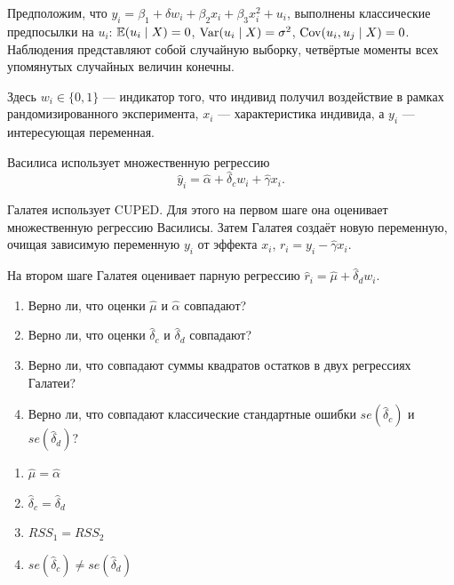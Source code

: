 \begin{problem}
Предположим, что $y_i = \beta_1 + \delta w_i + \beta_2 x_i + \beta_3 x_i^2 + u_i$,
 выполнены классические предпосылки на $u_i$: $\operatorname{\mathbb E}(u_i \mid X) = 0$,
 $\operatorname{Var}(u_i \mid X) = \sigma^2$, $\operatorname{Cov}(u_i, u_j \mid X) = 0$.
 Наблюдения представляют собой случайную выборку, четвёртые моменты 
 всех упомянутых случайных величин конечны. 

 Здесь $w_i \in \{0, 1\}$ — индикатор того, что индивид получил воздействие 
 в рамках рандомизированного эксперимента, $x_i$ — характеристика индивида,
а $y_i$ — интересующая переменная. 
  
Василиса использует множественную регрессию 
\[
  \hat y_i = \hat \alpha + \hat \delta_c w_i + \hat \gamma x_i.
\]

Галатея использует CUPED. Для этого на первом шаге она оценивает 
множественную регрессию Василисы.
Затем Галатея создаёт новую переменную, очищая зависимую переменную $y_i$ 
от эффекта $x_i$, $r_i =  y_i - \hat \gamma x_i$.

На втором шаге Галатея оценивает парную регрессию $\hat r_i = \hat \mu + \hat \delta_d w_i$.

\begin{enumerate}
  \item Верно ли, что оценки $\hat \mu$ и $\hat \alpha$ совпадают?
  \item Верно ли, что оценки $\hat \delta_c$ и $\hat \delta_d$ совпадают?
  \item Верно ли, что совпадают суммы квадратов остатков в двух регрессиях Галатеи?
  \item Верно ли, что совпадают классические стандартные ошибки $se(\hat\delta_c)$
  и $se(\hat\delta_d)$?
\end{enumerate}

  \begin{sol}
  \begin{enumerate}
\item $\hat \mu = \hat \alpha$
\item $\hat \delta_c = \hat \delta_d$ 
\item $RSS_1 = RSS_2$
\item $se(\hat\delta_c) \neq se(\hat\delta_d)$
\end{enumerate}
  
  \end{sol}
  
\end{problem}





